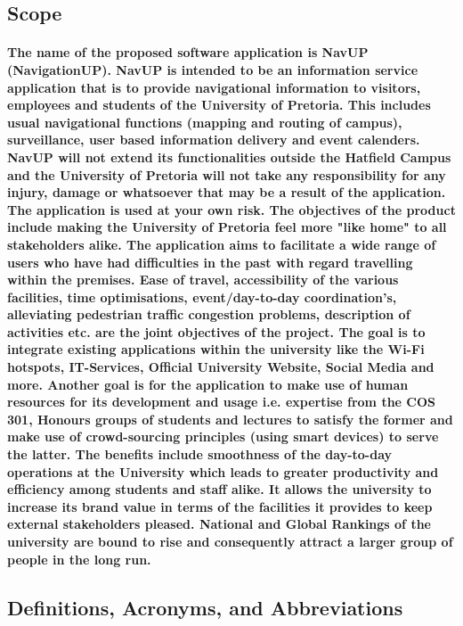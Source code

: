 \documentclass[runningheads,a4paper]{llncs}
\begin{document}
\subsection{Scope}
\paragraph*{The name of the proposed software application is NavUP (NavigationUP). NavUP is intended to be an information service application that is to provide navigational information to visitors, employees and students of the University of Pretoria. This includes usual navigational functions (mapping and routing of campus), surveillance, user based information delivery and event calenders. NavUP will not extend its functionalities outside the Hatfield Campus and the University of Pretoria will not take any responsibility for any injury, damage or whatsoever that may be a result of the application. The application is used at your own risk. The objectives of the product include making the University of Pretoria feel more "like home" to all stakeholders alike. The application aims to facilitate a wide range of users who have had difficulties in the past with regard travelling within the premises. Ease of travel, accessibility of the various facilities, time optimisations, event/day-to-day coordination's, alleviating pedestrian traffic congestion problems, description of activities etc. are the joint objectives of the project. The goal is to integrate existing applications within the university like the Wi-Fi hotspots, IT-Services, Official University Website, Social Media and more.  Another goal is for the application to make use of human resources for its development and usage i.e. expertise from the COS 301, Honours groups of students and lectures to satisfy the former and make use of crowd-sourcing principles (using smart devices) to serve the latter. The benefits include smoothness of the day-to-day operations at the University which leads to greater productivity and efficiency among students and staff alike. It allows the university to increase its brand value in terms of the facilities it provides to keep external stakeholders pleased. National and Global Rankings of the university are bound to rise and consequently attract a larger group of people in the long run.}
\subsection{Definitions, Acronyms, and Abbreviations}
\end{document}
